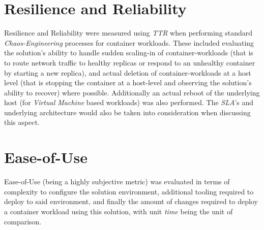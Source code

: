 \section{Resilience and Reliability}
Resilience and Reliability were measured using \textit{TTR} when performing standard \textit{Chaos-Engineering} processes for container workloads.
These included evaluating the solution's ability to handle sudden scaling-in of container-workloads (that is to route network traffic to healthy replicas or respond to an unhealthy container by starting a new replica),
and actual deletion of container-workloads at a host level (that is stopping the container at a host-level and observing the solution's ability to recover) where possible.
Additionally an actual reboot of the underlying host (for \textit{Virtual Machine} based workloads) was also performed.
The \textit{SLA}'s and underlying architecture would also be taken into consideration when discussing this aspect.

\section{Ease-of-Use}
Ease-of-Use (being a highly subjective metric) was evaluated in terms of complexity to configure the solution environment, additional tooling required to deploy to said environment,
and finally the amount of changes required to deploy a container workload using this solution, with unit \textit{time} being the unit of comparison.
